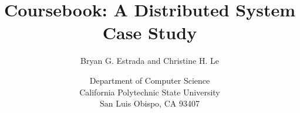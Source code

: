 \documentclass[12pt]{report}
\begin{document}
\title{Coursebook: A Distributed System Case Study}
\author{Bryan G. Estrada and Christine H. Le}
\date{Department of Computer Science\\
      California Polytechnic State University\\
      San Luis Obispo, CA  93407}
      
\begin{titlepage}
\maketitle\thispagestyle{empty}
\end{titlepage}

\doublespace
\tableofcontents
\listoffigures








\end{document}
